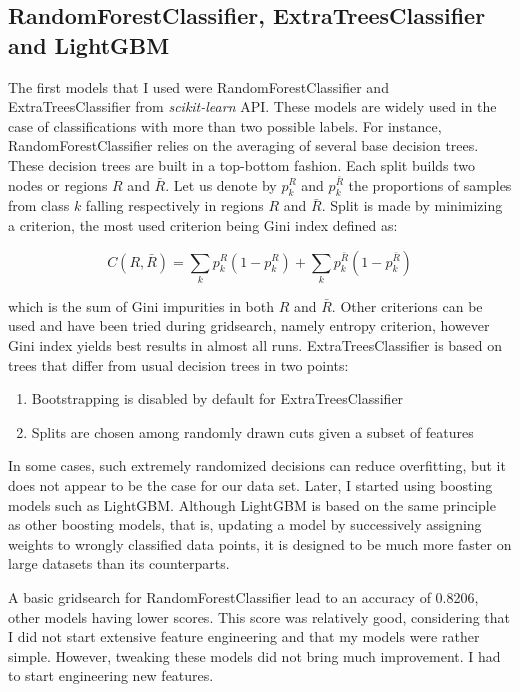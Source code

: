 \documentclass{article}
\begin{document}
\begin{multicols}{2}
\subsection{RandomForestClassifier, ExtraTreesClassifier and LightGBM}

The first models that I used were RandomForestClassifier and ExtraTreesClassifier from \textit{scikit-learn}\cite{sklearn} API. These models are widely used in the case of classifications with more
than two possible labels. For instance, RandomForestClassifier relies on
the averaging of several base decision trees. These decision
trees are built in a top-bottom fashion. Each split builds two nodes or
regions $R$ and $\bar{R}$. Let us denote by $p^{R}_k$ and $p^{\bar{R}}_k$
the proportions of samples from class $k$ falling respectively in regions
$R$ and $\bar{R}$. Split is made by minimizing a criterion, the most used
criterion being Gini index defined as:

\begin{center}
  $$
  C(R, \bar{R}) = \sum \limits_{k} p^R_k (1 - p^R_k) +
  \sum \limits_{k} p^{\bar{R}}_k (1 - p^{\bar{R}}_k)
  $$
\end{center}

\noindent which is the sum of Gini impurities in both $R$ and $\bar{R}$.
Other criterions can be used and have been tried during gridsearch, namely entropy
criterion, however Gini index yields best results in almost all runs. ExtraTreesClassifier is
based on trees that differ from usual decision trees in two points:

\begin{enumerate}[wide, labelindent=5pt, itemsep=0pt, topsep=0pt]
  \item Bootstrapping is disabled by default for ExtraTreesClassifier
  \item Splits are chosen among randomly drawn cuts given a subset of features
\end{enumerate}

In some cases, such extremely randomized decisions can reduce overfitting,
but it does not appear to be the case for our data set. Later, I started using boosting models such as LightGBM\cite{lightgbm}. Although LightGBM is based
on the same principle as other boosting models, that is, updating a model by
successively assigning weights to wrongly classified data points, it is designed to
be much more faster on large datasets than its counterparts.

A basic
gridsearch for RandomForestClassifier
lead to an accuracy of 0.8206, other models having lower scores. This score
was relatively good, considering that I did not start extensive feature engineering
and that my models were rather simple. However, tweaking these models did not bring much
improvement. I had to start engineering new features.


\end{multicols}
\end{document}
